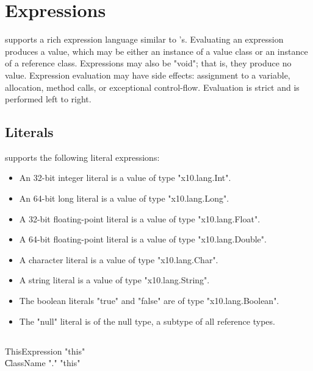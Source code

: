 \chapter{Expressions}\label{XtenExpressions}

\Xten{} supports a rich expression language similar to
\Java{}'s.
Evaluating an expression produces a value, which may be either
an instance of a value class or an instance of a reference
class. Expressions may also be \xcd"void"; that is, they produce no
value.
Expression evaluation may have side effects: assignment to a
variable, allocation, method calls, or exceptional control-flow.
Evaluation is strict and is performed left to right.

\section{Literals}

\Xten{} supports the following literal expressions: 
\begin{itemize}
\item An 32-bit integer literal is a value of type \xcd"x10.lang.Int".
\item An 64-bit long literal is a value of type \xcd"x10.lang.Long".
\item A 32-bit floating-point literal is a value of type \xcd"x10.lang.Float".
\item A 64-bit floating-point literal is a value of type \xcd"x10.lang.Double".
\item A character literal is a value of type \xcd"x10.lang.Char".
\item A string literal is a value of type \xcd"x10.lang.String".
\item The boolean literals \xcd"true" and \xcd"false" are of type
\xcd"x10.lang.Boolean".
\item The \xcd"null" literal is of the null type,
a subtype of all reference types.
\end{itemize}

\section{}

\begin{grammar}
ThisExpression \: \xcd"this" \\
\| ClassName \xcd"." \xcd"this" \\
\end{grammar}


